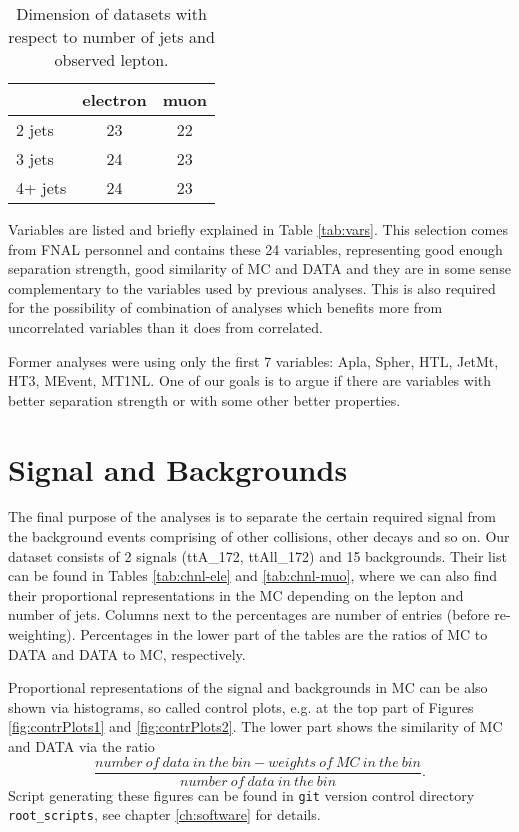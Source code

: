 \begin{table}[htb]
\caption{Dimension of datasets with respect to number of jets and observed lepton.}
\centering
\begin{tabular}{|l|c|c|}
\hline 
 & electron & muon \\ 
\hline 
2 jets & 23 & 22 \\ 
\hline 
3 jets & 24 & 23 \\ 
\hline 
4+ jets & 24 & 23 \\ 
\hline 
\end{tabular} 
\label{tab:data-dims}
\end{table}

Variables are listed and briefly explained in Table \ref{tab:vars}. This selection comes from  FNAL personnel and contains these 24 variables, representing good enough separation strength, good similarity of MC and DATA and they are in some sense complementary to the variables used by previous \dzero analyses. This is also required for the possibility of combination of analyses which benefits more from uncorrelated variables than it does from correlated. 

Former \dzero analyses were using only the first 7 variables: \textsf{Apla, Spher, HTL, JetMt, HT3, MEvent, MT1NL}. One of our goals is to argue if there are variables with better separation strength or with some other better properties. 

\section{Signal and Backgrounds}


The final purpose of the analyses is to separate the certain required signal from the background events comprising of other collisions, other decays and so on. Our dataset consists of 2 signals (\textsf{ttA\_172, ttAll\_172}) and 15 backgrounds. Their list can be found in Tables \ref{tab:chnl-ele} and \ref{tab:chnl-muo}, where we can also find their proportional representations in the MC depending on the lepton and number of jets. Columns next to the percentages are number of entries (before re-weighting). Percentages in the lower part of the tables are the ratios of MC to DATA and DATA to MC, respectively.





Proportional representations of the signal and backgrounds in MC can be also shown via histograms, so called control plots, e.g. at the top part of Figures  \ref{fig:contrPlots1} and \ref{fig:contrPlots2}. The lower part shows the similarity of MC and DATA via the ratio
\begin{equation*}
\frac{number\:of\:data\:in\:the\:bin - weights\:of\:MC\:in\:the\:bin}{number\:of\:data\:in\:the\:bin}.
\end{equation*}
Script generating these figures can be found in \texttt{git} version control directory \texttt{root\_scripts}, see chapter \ref{ch:software} for details. 

